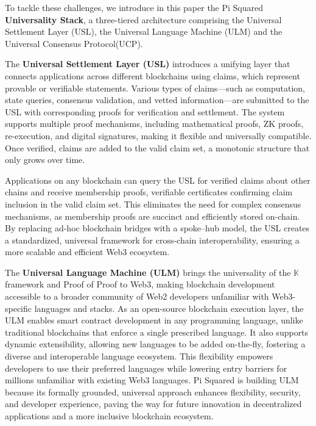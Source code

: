 \documentclass{article}
\newcommand{\K}{\ensuremath{\mathbb{K}}}
\newcommand{\UniCon}{Universal Consensus Protocol}
\newcommand{\UC}{UCP}
\begin{document}
To tackle these challenges, we introduce in this paper the Pi Squared \textbf{Universality Stack}, a three-tiered architecture comprising the Universal Settlement Layer (USL), the Universal Language Machine (ULM) and the \UniCon (\UC).

The \textbf{Universal Settlement Layer (USL)} introduces a unifying layer that connects applications across different blockchains using claims, which represent provable or verifiable statements. Various types of claims—such as computation, state queries, consensus validation, and vetted information—are submitted to the USL with corresponding proofs for verification and settlement. The system supports multiple proof mechanisms, including mathematical proofs, ZK proofs, re-execution, and digital signatures, making it flexible and universally compatible. Once verified, claims are added to the valid claim set, a monotonic structure that only grows over time.

Applications on any blockchain can query the USL for verified claims about other chains and receive membership proofs, verifiable certificates confirming claim inclusion in the valid claim set. This eliminates the need for complex consensus mechanisms, as membership proofs are succinct and efficiently stored on-chain. By replacing ad-hoc blockchain bridges with a spoke–hub model, the USL creates a standardized, universal framework for cross-chain interoperability, ensuring a more scalable and efficient Web3 ecosystem.

The \textbf{Universal Language Machine (ULM)} brings the universality of the \K{} framework and Proof of Proof to Web3, making blockchain development accessible to a broader community of Web2 developers unfamiliar with Web3-specific languages and stacks. As an open-source blockchain execution layer, the ULM enables smart contract development in any programming language, unlike traditional blockchains that enforce a single prescribed language. It also supports dynamic extensibility, allowing new languages to be added on-the-fly, fostering a diverse and interoperable language ecosystem. This flexibility empowers developers to use their preferred languages while lowering entry barriers for millions unfamiliar with existing Web3 languages. Pi Squared is building ULM because its formally grounded, universal approach enhances flexibility, security, and developer experience, paving the way for future innovation in decentralized applications and a more inclusive blockchain ecosystem.
\end{document}
